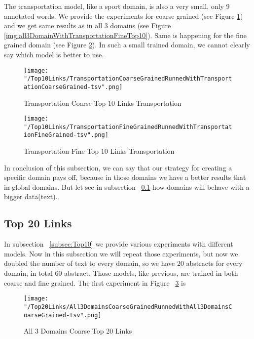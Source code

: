 \documentclass[thesis=M,english]{FITthesis}[2018/05/30]
\begin{document}
	The transportation model, like a sport domain, is also a very small, only 9 annotated words. We provide the experiments for coarse grained (see Figure \ref{img:TransportationtWithTransportationCoarseTop10}) and we get same results as in all 3 domains (see Figure \ref{img:all3DomainWithTransportationFineTop10}). Same is happening for the fine grained domain (see Figure \ref{img:TransportationWithTransportationFineTop10}). In such a small trained domain, we cannot clearly say which model is better to use.
	\begin{figure}[H]\centering
		\texttt{[image: "/Top10Links/TransportationCoarseGrainedRunnedWithTransportationCoarseGrained-tsv".png]}
		\caption{Transportation Coarse Top 10 Links Transportation}\label{img:TransportationtWithTransportationCoarseTop10}
	\end{figure}		
	
	\begin{figure}[H]\centering
		\texttt{[image: "/Top10Links/TransportationFineGrainedRunnedWithTransportationFineGrained-tsv".png]}
		\caption{Transportation Fine Top 10 Links Transportation}\label{img:TransportationWithTransportationFineTop10}
	\end{figure}
	
	In conclusion of this subsection, we can say that our strategy for creating a specific domain pays off, because in those domains we have a better results that in global domains. But let see in subsection ~\ref{subsec:Top20} how domains will behave with a bigger data(text).

\subsection{Top 20 Links}\label{subsec:Top20}
	In subsection ~\ref{subsec:Top10} we provide various experiments with different models. Now in this subsection we will repeat those experiments, but now we doubled the number of text to every domain, so we have 20 abstracts for every domain, in total 60 abstract. Those models, like previous, are trained in both coarse and fine grained.
	The first experiment in Figure ~\ref{img:All3DomainWithAll3DomainCoarseTop20} is    
	\begin{figure}[H]\centering
		\texttt{[image: "/Top20Links/All3DomainsCoarseGrainedRunnedWithAll3DomainsCoarseGrained-tsv".png]}
		\caption{All 3 Domains Coarse Top 20 Links}\label{img:All3DomainWithAll3DomainCoarseTop20}
	\end{figure}
\end{document}

